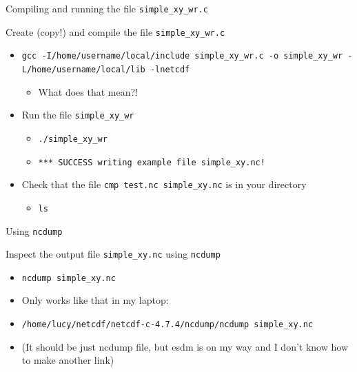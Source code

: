 \documentclass[compress,11pt,xcolor=svgnames,aspectratio=169]{beamer}
\begin{document}
\begin{frame}[fragile]{Compiling and running the file \texttt{simple\_xy\_wr.c}}

Create (copy!) and compile the file \verb|simple_xy_wr.c|

\begin{itemize}

  \item \tiny{\verb|gcc -I/home/username/local/include simple_xy_wr.c -o simple_xy_wr -L/home/username/local/lib -lnetcdf|}

  \begin{itemize}

    \item What does that mean?!

  \end{itemize}

\end{itemize}

\begin{itemize}

  \item Run the file \verb|simple_xy_wr|

  \begin{itemize}

    \item \verb|./simple_xy_wr|
    \item \verb|*** SUCCESS writing example file simple_xy.nc!|\\[0.5cm]

  \end{itemize}

  \item Check that the file \verb|cmp test.nc simple_xy.nc| is in your directory

    \begin{itemize}

      \item \verb|ls|

    \end{itemize}

\end{itemize}

\end{frame}

\begin{frame}[fragile]{Using \texttt{ncdump}}

Inspect the output file \verb|simple_xy.nc| using \verb|ncdump|

\begin{itemize}

  \item \verb|ncdump simple_xy.nc|

  \item Only works like that in my laptop:

  \item \verb|/home/lucy/netcdf/netcdf-c-4.7.4/ncdump/ncdump simple_xy.nc|

  \item (It should be just ncdump file, but esdm is on my way and I don’t know how to make another link)

\end{itemize}

\end{frame}
\end{document}
